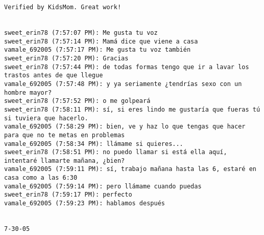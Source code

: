 \begin{verbatim}
Verified by KidsMom. Great work!


sweet_erin78 (7:57:07 PM): Me gusta tu voz
sweet_erin78 (7:57:14 PM): Mamá dice que viene a casa
vamale_692005 (7:57:17 PM): Me gusta tu voz también
sweet_erin78 (7:57:20 PM): Gracias
sweet_erin78 (7:57:44 PM): de todas formas tengo que ir a lavar los trastos antes de que llegue
vamale_692005 (7:57:48 PM): y ya seriamente ¿tendrías sexo con un hombre mayor?
sweet_erin78 (7:57:52 PM): o me golpeará
sweet_erin78 (7:58:11 PM): sí, si eres lindo me gustaría que fueras tú si tuviera que hacerlo.
vamale_692005 (7:58:29 PM): bien, ve y haz lo que tengas que hacer para que no te metas en problemas
vamale_692005 (7:58:34 PM): llámame si quieres...
sweet_erin78 (7:58:51 PM): no puedo llamar si está ella aquí, intentaré llamarte mañana, ¿bien?
vamale_692005 (7:59:11 PM): sí, trabajo mañana hasta las 6, estaré en casa como a las 6:30
vamale_692005 (7:59:14 PM): pero llámame cuando puedas
sweet_erin78 (7:59:17 PM): perfecto
vamale_692005 (7:59:23 PM): hablamos después


7-30-05




\end{verbatim}

